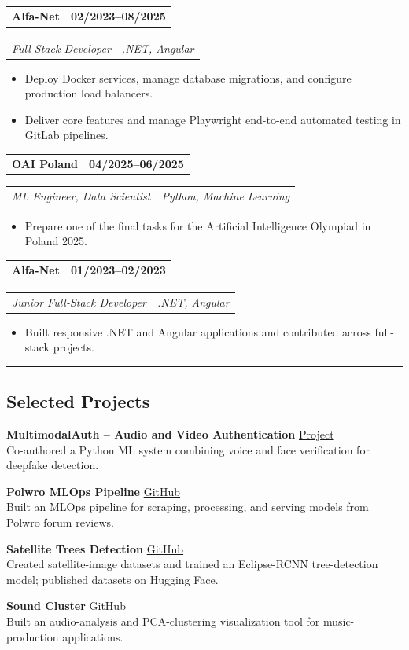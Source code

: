 \documentclass[10pt,a4paper]{extarticle}
\makeatletter
\newcommand{\headerrow}[2]{%
  \begin{tabular*}{\linewidth}{@{}l@{\extracolsep{\fill}}r@{}}
    #1 & #2 \\
  \end{tabular*}%
}
\newcommand{\cvsection}[1]{%
  \vspace{1pt}\hrule\vspace{-1pt}
  \subsection*{\large\color{accent}#1}
  \vspace{-5pt}
}
\newcommand{\entry}[4]{%
  \headerrow{\textbf{#1}}{\textbf{#2}}
  \headerrow{\emph{#3}}{\emph{#4}}

}
\makeatother
\begin{document}
\entry{Alfa-Net}{02/2023--08/2025}{Full-Stack Developer}{.NET, Angular}
\begin{itemize}
  \item Deploy Docker services, manage database migrations, and configure production load balancers.
  \item Deliver core features and manage Playwright end-to-end automated testing in GitLab pipelines.
\end{itemize}
\vspace{3pt}

\entry{OAI Poland}{04/2025--06/2025}{ML Engineer, Data Scientist}{Python, Machine Learning}
\begin{itemize}
  \item Prepare one of the final tasks for the Artificial Intelligence Olympiad in Poland 2025.
\end{itemize}
\vspace{3pt}

\entry{Alfa-Net}{01/2023--02/2023}{Junior Full-Stack Developer}{.NET, Angular}
\begin{itemize}
  \item Built responsive .NET and Angular applications and contributed across full-stack projects.
\end{itemize}



\cvsection{Selected Projects}
\textbf{MultimodalAuth -- Audio and Video Authentication} \hfill \href{https://filipstrozik.github.io/multimodalauth/}{Project}\\
Co-authored a Python ML system combining voice and face verification for deepfake detection.

\textbf{Polwro MLOps Pipeline} \hfill \href{https://github.com/Filipstrozik/lsdp-mini-project}{GitHub}\\
Built an MLOps pipeline for scraping, processing, and serving models from Polwro forum reviews.

\textbf{Satellite Trees Detection} \hfill \href{https://github.com/Filipstrozik/spatial-data}{GitHub}\\
Created satellite-image datasets and trained an Eclipse-RCNN tree-detection model; published datasets on Hugging Face.

\textbf{Sound Cluster} \hfill \href{https://github.com/Filipstrozik/sound_cluster}{GitHub}\\
Built an audio-analysis and PCA-clustering visualization tool for music-production applications.
\end{document}
